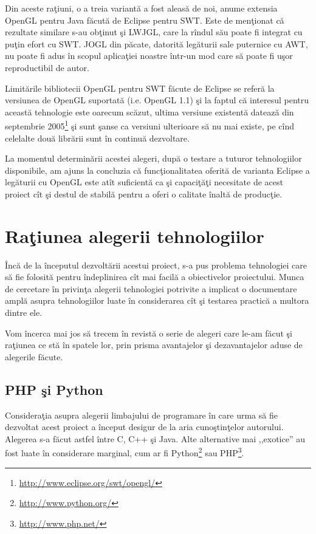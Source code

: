 Din aceste raţiuni, o a treia variantă a fost aleasă de noi, anume extensia 
OpenGL pentru Java făcută de Eclipse pentru SWT. Este de menţionat că rezultate 
similare s-au obţinut şi LWJGL, care la rîndul său poate fi integrat cu puţin 
efort cu SWT. JOGL din păcate, datorită legăturii sale puternice cu AWT, nu 
poate fi adus în scopul aplicaţiei noastre într-un mod care să poate fi uşor 
reproductibil de autor.

Limitările bibliotecii OpenGL pentru SWT făcute de Eclipse se referă la 
versiunea de OpenGL suportată (i.e. OpenGL 1.1) şi la faptul că interesul 
pentru această tehnologie este oarecum scăzut, ultima versiune existentă 
datează din septembrie 2005\footnote{\url{http://www.eclipse.org/swt/opengl/}} 
şi sunt şanse ca versiuni ulterioare să nu mai existe, pe cînd celelalte două 
librării sunt în continuă dezvoltare.

La momentul determinării acestei alegeri, după o testare a tuturor 
tehnologiilor disponibile, am ajuns la concluzia că funcţionalitatea oferită de 
varianta Eclipse a legăturii cu OpenGL este atît suficientă ca şi capaciţăţi 
necesitate de acest proiect cît şi destul de stabilă pentru a oferi o calitate 
înaltă de producţie.

\section{Raţiunea alegerii tehnologiilor}

Încă de la începutul dezvoltării acestui proiect, s-a pus problema tehnologiei 
care să fie folosită pentru îndeplinirea cît mai facilă a obiectivelor 
proiectului. Munca de cercetare în privinţa alegerii tehnologiei potrivite a 
implicat o documentare amplă asupra tehnologiilor luate în considerarea cît şi 
testarea practică a multora dintre ele.

Vom încerca mai jos să trecem în revistă o serie de alegeri care le-am făcut şi 
raţiunea ce stă în spatele lor, prin prisma avantajelor şi dezavantajelor aduse 
de alegerile făcute.

\subsection{PHP şi Python}

Consideraţia asupra alegerii limbajului de programare în care urma să fie 
dezvoltat acest proiect a început desigur de la aria cunoştinţelor autorului. 
Alegerea s-a făcut astfel între C, C++ şi Java. Alte alternative mai 
,,exotice'' au fost luate în considerare marginal, cum ar fi 
Python\footnote{\url{http://www.python.org/}} sau 
PHP\footnote{\url{http://www.php.net/}}.

